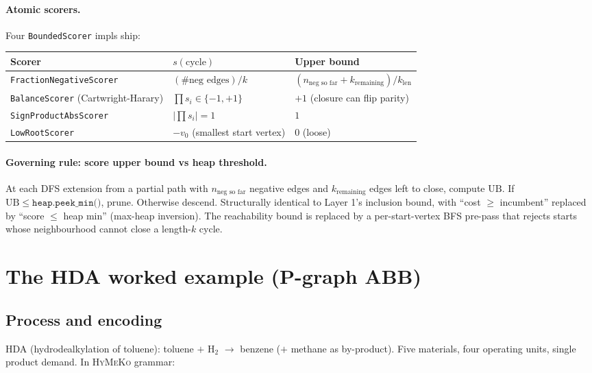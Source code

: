 \documentclass[11pt,a4paper]{article}
\newcommand{\HyMeKo}{\textsc{HyMeKo}}
\newcommand{\code}[1]{\texttt{\small #1}}
\begin{document}
\paragraph{Atomic scorers.} Four \code{BoundedScorer} impls ship:
\begin{center}\small
\begin{tabular}{lll}
\toprule
Scorer & $s(\text{cycle})$ & Upper bound \\
\midrule
\code{FractionNegativeScorer} & $(\#\text{neg edges}) / k$ & $(n_{\text{neg so far}} + k_{\text{remaining}}) / k_{\text{len}}$ \\
\code{BalanceScorer} (Cartwright-Harary) & $\prod s_i \in \{-1, +1\}$ & $+1$ (closure can flip parity) \\
\code{SignProductAbsScorer}              & $|\prod s_i| = 1$         & $1$ \\
\code{LowRootScorer} & $-v_0$ (smallest start vertex) & $0$ (loose) \\
\bottomrule
\end{tabular}
\end{center}

\paragraph{Governing rule: score upper bound vs heap threshold.}
At each DFS extension from a partial path with $n_{\text{neg so far}}$
negative edges and $k_{\text{remaining}}$ edges left to close,
compute $\mathrm{UB}$. If $\mathrm{UB} \leq \texttt{heap.peek\_min()}$,
prune. Otherwise descend. Structurally identical to Layer 1's
inclusion bound, with ``cost $\geq$ incumbent'' replaced by
``score $\leq$ heap min'' (max-heap inversion). The reachability bound
is replaced by a per-start-vertex BFS pre-pass that rejects starts
whose neighbourhood cannot close a length-$k$ cycle.

\section{The HDA worked example (P-graph ABB)}

\subsection{Process and encoding}

HDA (hydrodealkylation of toluene): toluene $+$ H$_2$ $\to$ benzene
($+$ methane as by-product). Five materials, four operating units,
single product demand. In \HyMeKo{} grammar:
\end{document}
